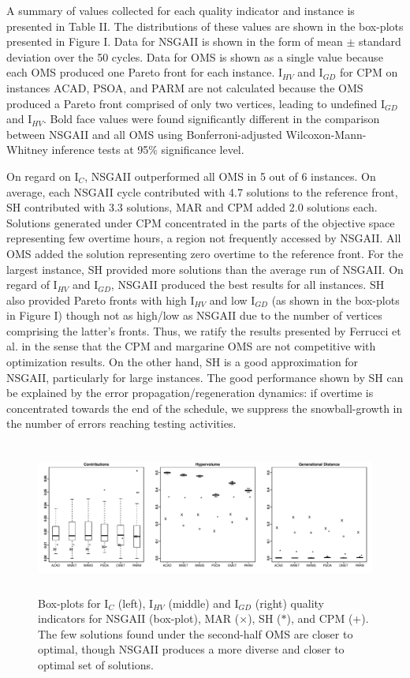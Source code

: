 \documentclass[conference]{IEEEtran}
\begin{document}
A summary of values collected for each quality indicator and instance is presented in Table II. The distributions of these values are shown in the box-plots presented in Figure I. Data for NSGAII is shown in the form of mean $\pm$ standard deviation over the 50 cycles. Data for OMS is shown as a single value because each OMS produced one Pareto front for each instance. I$_{HV}$ and I$_{GD}$ for CPM on instances ACAD, PSOA, and PARM are not calculated because the OMS produced a Pareto front comprised of only two vertices, leading to undefined I$_{GD}$ and I$_{HV}$. Bold face values were found significantly different in the comparison between NSGAII and all OMS using Bonferroni-adjusted Wilcoxon-Mann-Whitney inference tests at 95\% significance level. 

On regard on I$_{C}$, NSGAII outperformed all OMS in 5 out of 6 instances. On average, each NSGAII cycle contributed with 4.7 solutions to the reference front, SH contributed with 3.3 solutions, MAR and CPM added 2.0 solutions each. Solutions generated under CPM concentrated in the parts of the objective space representing few overtime hours, a region not frequently accessed by NSGAII. All OMS added the solution representing zero overtime to the reference front. For the largest instance, SH provided more solutions than the average run of NSGAII. On regard of I$_{HV}$ and I$_{GD}$, NSGAII produced the best results for all instances. SH also provided Pareto fronts with high I$_{HV}$ and low I$_{GD}$ (as shown in the box-plots in Figure I) though not as high/low as NSGAII due to the number of vertices comprising the latter's fronts. Thus, we ratify the results presented by Ferrucci et al. \cite{Ferrucci:2013} in the sense that the CPM and margarine OMS are not competitive with optimization results. On the other hand, SH is a good approximation for NSGAII, particularly for large instances. The good performance shown by SH can be explained by the error propagation/regeneration dynamics: if overtime is concentrated towards the end of the schedule, we suppress the snowball-growth in the number of errors reaching testing activities.

\begin{figure}
\centering
\includegraphics[width=18cm, height=5cm]{boxplots2.pdf}
\caption{Box-plots for I$_{C}$ (left), I$_{HV}$ (middle) and I$_{GD}$ (right) quality indicators for NSGAII (box-plot), MAR ($\times$), SH ($\ast$), and CPM (+). The few solutions found under the second-half OMS are closer to optimal, though NSGAII produces a more diverse and closer to optimal set of solutions.}
\end{figure}
\end{document}
